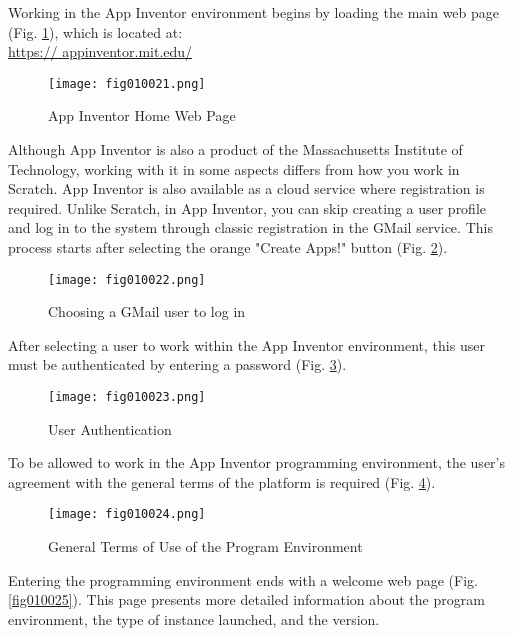 Working in the App Inventor environment begins by loading the main web page (Fig. \ref{fig010021}), which is located at: \\ \href{https://appinventor.mit.edu/}{https:// appinventor.mit.edu/}

\begin{figure}[H]
   \centering
   \texttt{[image: fig010021.png]}
   \caption{App Inventor Home Web Page}
\label{fig010021}
\end{figure}

Although App Inventor is also a product of the Massachusetts Institute of Technology, working with it in some aspects differs from how you work in Scratch. App Inventor is also available as a cloud service where registration is required. Unlike Scratch, in App Inventor, you can skip creating a user profile and log in to the system through classic registration in the GMail service. This process starts after selecting the orange "Create Apps!" button (Fig. \ref{fig010022}).

\begin{figure}[H]
   \centering
   \texttt{[image: fig010022.png]}
   \caption{Choosing a GMail user to log in}
\label{fig010022}
\end{figure}

After selecting a user to work within the App Inventor environment, this user must be authenticated by entering a password (Fig. \ref{fig010023}).

\begin{figure}[H]
   \centering
   \texttt{[image: fig010023.png]}
   \caption{User Authentication}
\label{fig010023}
\end{figure}

To be allowed to work in the App Inventor programming environment, the user's agreement with the general terms of the platform is required (Fig. \ref{fig010024}).

\begin{figure}[H]
   \centering
   \texttt{[image: fig010024.png]}
   \caption{General Terms of Use of the Program Environment}
\label{fig010024}
\end{figure}

Entering the programming environment ends with a welcome web page (Fig. \ref{fig010025}). This page presents more detailed information about the program environment, the type of instance launched, and the version.

